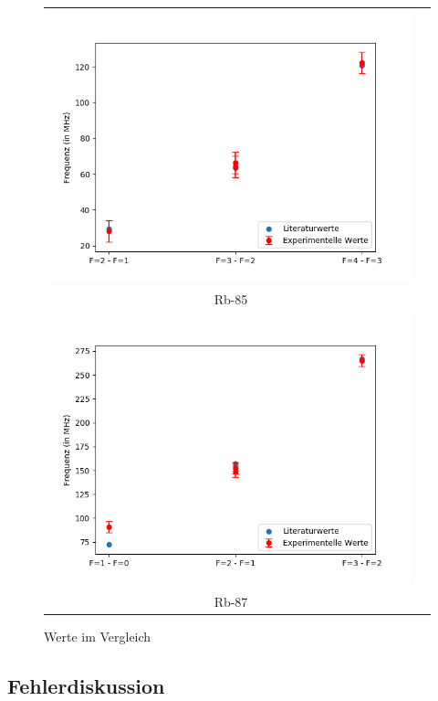 \documentclass[a4paper,parskip]{scrartcl}
\begin{document}
\begin{figure}[H]
\centering
\begin{tabular}{cc}
    \includegraphics[width = \textwidth]{daten_Rb-85.png}  \\
    {\footnotesize Rb-85}  \\
   \includegraphics[width = \textwidth]{daten_Rb-87.png}  \\
    {\footnotesize Rb-87}  \\
\end{tabular}
\caption{Werte im Vergleich}
\label{fig:Abbildung2}
\end{figure}

\subsection{Fehlerdiskussion}
\end{document}
